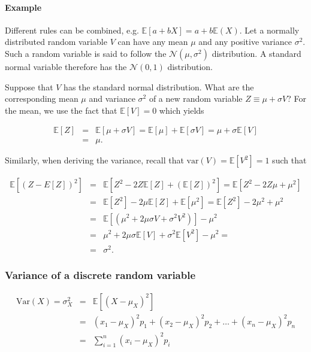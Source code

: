 \paragraph{Example} Different rules can be combined, e.g. $\mathbb{E}[a + bX] = a + b\mathbb{E}(X)$. Let a normally distributed random variable $V$ can have any mean $\mu$ and any positive variance $\sigma^{2}$. Such a random variable is said to follow the $\mathcal{N}(\mu, \sigma^{2})$ distribution. A standard normal variable therefore has the $\mathcal{N}(0, 1)$ distribution.

Suppose that $V$ has the standard normal distribution. What are the corresponding mean $\mu$ and variance $\sigma^{2}$ of a new random variable $Z \equiv \mu + \sigma V$? For the mean, we use the fact that $\mathbb{E}\left[V\right]=0$ which yields

\begin{eqnarray*}
\mathbb{E}\left[Z\right] &=& \mathbb{E}\left[\mu + \sigma V\right] = \mathbb{E}\left[\mu\right] + \mathbb{E}\left[\sigma V\right] = \mu + \sigma\mathbb{E}\left[V\right]\\
&=& \mu.
\end{eqnarray*}

Similarly, when deriving the variance, recall that $\text{var}(V)=\mathbb{E}\left[V^{2}\right]=1$ such that

\begin{eqnarray*}
    \mathbb{E}\left[(Z-E\left[Z\right])^{2}\right] &=& \mathbb{E}\left[Z^{2}-2Z\mathbb{E}\left[Z\right]+ (\mathbb{E}\left[Z\right])^{2}\right]= \mathbb{E}\left[Z^{2} -2Z\mu + \mu^{2}\right]\\
    &=& \mathbb{E}\left[Z^{2}\right] -2\mu\mathbb{E}\left[Z\right] + \mathbb{E}\left[\mu^{2}\right]= \mathbb{E}\left[Z^{2}\right] -2\mu^{2} + \mu^{2}\\
    &=& \mathbb{E}\left[(\mu^{2}+ 2\mu\sigma V + \sigma^{2}V^{2})\right] -\mu^{2} \\
    &=& \mu^{2} + 2\mu\sigma \mathbb{E}\left[V\right] +\sigma^{2}\mathbb{E}\left[V^{2}\right] -\mu^{2} =  \\
    &=& \sigma^{2}.
    \end{eqnarray*}


\subsubsection{Variance of a discrete random variable}
\begin{eqnarray}
\textrm{Var}(X) = \sigma^{2}_{X} &=& \mathbb{E}[(X-\mu_{X})^{2}]\nonumber \\
&=& (x_{1} - \mu_{X})^{2}p_{1} + (x_{2} - \mu_{X})^{2}p_{2} + \ldots + (x_{n} - \mu_{X})^{2}p_{n} \nonumber\\
&=& \sum^{n}_{i=1}(x_{i} - \mu_{X})^{2}p_{i}
\end{eqnarray}

